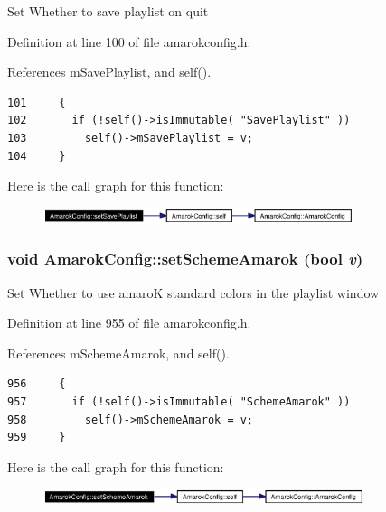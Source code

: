 Set Whether to save playlist on quit 

Definition at line 100 of file amarokconfig.h.

References m\-Save\-Playlist, and self().



\footnotesize\begin{verbatim}101     {
102       if (!self()->isImmutable( "SavePlaylist" ))
103         self()->mSavePlaylist = v;
104     }
\end{verbatim}\normalsize 


Here is the call graph for this function:\begin{figure}[H]
\begin{center}
\leavevmode
\includegraphics[width=257pt]{classAmarokConfig_AmarokConfige9_cgraph}
\end{center}
\end{figure}
\subsubsection{\setlength{\rightskip}{0pt plus 5cm}void Amarok\-Config::set\-Scheme\-Amarok (bool {\em v})\hspace{0.3cm}{\tt  [inline, static]}}\label{classAmarokConfig_AmarokConfige99}


Set Whether to use amaro\-K standard colors in the playlist window 

Definition at line 955 of file amarokconfig.h.

References m\-Scheme\-Amarok, and self().



\footnotesize\begin{verbatim}956     {
957       if (!self()->isImmutable( "SchemeAmarok" ))
958         self()->mSchemeAmarok = v;
959     }
\end{verbatim}\normalsize 


Here is the call graph for this function:\begin{figure}[H]
\begin{center}
\leavevmode
\includegraphics[width=266pt]{classAmarokConfig_AmarokConfige99_cgraph}
\end{center}
\end{figure}

